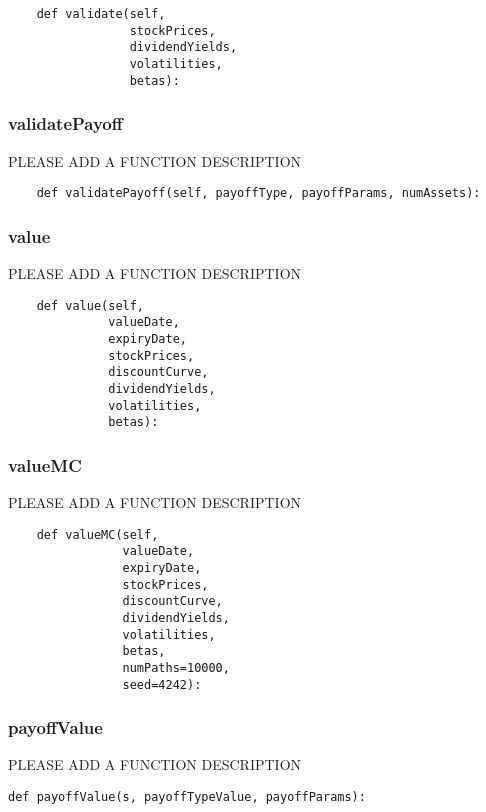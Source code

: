 \documentclass[twoside,11pt]{book}
\begin{document}
\begin{lstlisting}
    def validate(self,
                 stockPrices,
                 dividendYields,
                 volatilities,
                 betas):
\end{lstlisting}

\subsubsection*{{\bf validatePayoff}}
PLEASE ADD A FUNCTION DESCRIPTION

\begin{lstlisting}
    def validatePayoff(self, payoffType, payoffParams, numAssets):
\end{lstlisting}

\subsubsection*{{\bf value}}
PLEASE ADD A FUNCTION DESCRIPTION

\begin{lstlisting}
    def value(self, 
              valueDate, 
              expiryDate, 
              stockPrices, 
              discountCurve,
              dividendYields, 
              volatilities, 
              betas):
\end{lstlisting}

\subsubsection*{{\bf valueMC}}
PLEASE ADD A FUNCTION DESCRIPTION

\begin{lstlisting}
    def valueMC(self,
                valueDate,
                expiryDate,
                stockPrices,
                discountCurve,
                dividendYields,
                volatilities,
                betas,
                numPaths=10000,
                seed=4242):
\end{lstlisting}

\subsubsection*{{\bf payoffValue}}
PLEASE ADD A FUNCTION DESCRIPTION

\begin{lstlisting}
def payoffValue(s, payoffTypeValue, payoffParams):
\end{lstlisting}
\end{document}
